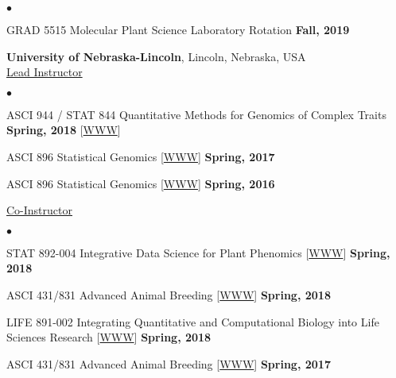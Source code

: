 \documentclass[margin,line,10pt]{res}
\newenvironment{list2}{
  \begin{list}{$\bullet$}{%
      \setlength{\itemsep}{0in}
      \setlength{\parsep}{0in} \setlength{\parskip}{0in}
      \setlength{\topsep}{0in} \setlength{\partopsep}{0in} 
      \setlength{\leftmargin}{0.2in}}}{\end{list}}
\begin{document}
\begin{resume}
\begin{list2}
\item GRAD 5515 Molecular Plant Science Laboratory Rotation
  \hfill {\bf Fall, 2019} 

\end{list2}


{\bf University of Nebraska-Lincoln}, Lincoln, Nebraska, USA  \vspace{0.2cm} \\
\underline{Lead Instructor}
\vspace{0.2cm}
\begin{list2}

\item ASCI 944 / STAT 844 Quantitative Methods for Genomics of Complex Traits
  \hfill {\bf Spring, 2018} 
   [\textcolor{blue}{\href{http://morotalab.org/asci944-2018/ASCI944.html}{WWW}}]

\item ASCI 896 Statistical Genomics [\textcolor{blue}{\href{http://morotalab.org/asci896-2017/ASCI896.html}{WWW}}]
  \hfill {\bf Spring, 2017}

\item ASCI 896 Statistical Genomics [\textcolor{blue}{\href{http://morotalab.org/asci896-2016/ASCI896.html}{WWW}}]
  \hfill {\bf Spring, 2016} 

\end{list2}
\vspace{.01pt}
        

\underline{Co-Instructor} 
\vspace{0.2cm}
\begin{list2}
  
\item STAT 892-004 Integrative Data Science for Plant Phenomics [\textcolor{blue}{\href{http://morotalab.org/stat892-2018/STAT892.html}{WWW}}]
  \hfill {\bf Spring, 2018}
  
  
\item ASCI 431/831 Advanced Animal Breeding [\textcolor{blue}{\href{http://morotalab.org/asci431-2018/ASCI431-831.html}{WWW}}]
  \hfill {\bf Spring, 2018} 


\item LIFE 891-002 Integrating Quantitative and Computational Biology into Life Sciences Research [\textcolor{blue}{\href{http://morotalab.org/life431-2018/life431-831.html}{WWW}}]
  \hfill {\bf Spring, 2018} 


\item ASCI 431/831 Advanced Animal Breeding [\textcolor{blue}{\href{http://morotalab.org/asci431-2017/ASCI431-831.html}{WWW}}]
  \hfill {\bf Spring, 2017} 


\end{list2}
\end{resume}
\end{document}
